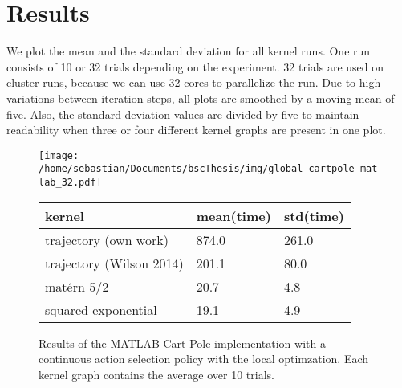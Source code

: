 \chapter{Results}
\label{chap:5}
%


We plot the mean and the standard deviation for all kernel runs. One run consists of 10 or 32 trials depending on the experiment. 32 trials are used on cluster runs, because we can use 32 cores to parallelize the run. Due to high variations between iteration steps, all plots are smoothed by a moving mean of five. Also, the standard deviation values are divided by five to maintain readability when three or four different kernel graphs are present in one plot.



\begin{figure}
\centering
\begin{minipage}{.6\textwidth}
  \centering
  \texttt{[image: /home/sebastian/Documents/bscThesis/img/global\_cartpole\_matlab\_32.pdf]}
\end{minipage}%
\begin{minipage}{.4\linewidth}
  \centering
  \begin{tabularx}{\linewidth}{|X|l|l|}
      \hline
      kernel & mean(time) & std(time)\\\hline
      trajectory (own work) & 874.0 & 261.0\\\hline
      trajectory (Wilson 2014) & 201.1 & 80.0\\\hline
      matérn 5/2 & 20.7 & 4.8\\\hline
      squared exponential & 19.1 & 4.9\\\hline
  \end{tabularx}
\end{minipage}
\caption{Results of the MATLAB Cart Pole implementation with a continuous action selection policy with the local optimzation. Each kernel graph contains the average over 10 trials.}
\label{fig:cartpolePygym}
\end{figure}

